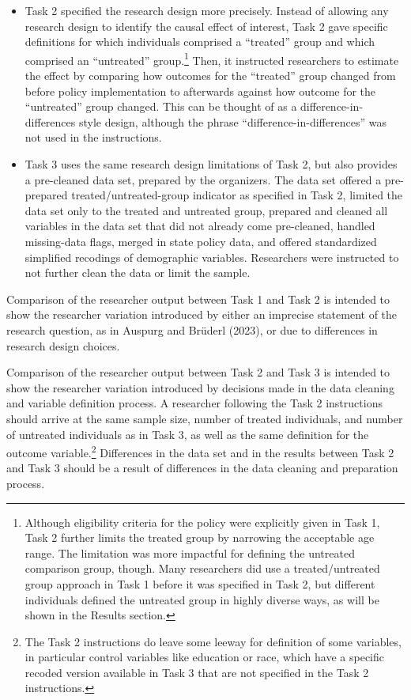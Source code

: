 \documentclass[
  letterpaper,
  DIV=11,
  numbers=noendperiod]{scrartcl}
\begin{document}
\begin{itemize}
\item
  Task 2 specified the research design more precisely. Instead of
  allowing any research design to identify the causal effect of
  interest, Task 2 gave specific definitions for which individuals
  comprised a ``treated'' group and which comprised an ``untreated''
  group.\footnote{Although eligibility criteria for the policy were
    explicitly given in Task 1, Task 2 further limits the treated group
    by narrowing the acceptable age range. The limitation was more
    impactful for defining the untreated comparison group, though. Many
    researchers did use a treated/untreated group approach in Task 1
    before it was specified in Task 2, but different individuals defined
    the untreated group in highly diverse ways, as will be shown in the
    Results section.} Then, it instructed researchers to estimate the
  effect by comparing how outcomes for the ``treated'' group changed
  from before policy implementation to afterwards against how outcome
  for the ``untreated'' group changed. This can be thought of as a
  difference-in-differences style design, although the phrase
  ``difference-in-differences'' was not used in the instructions.
\item
  Task 3 uses the same research design limitations of Task 2, but also
  provides a pre-cleaned data set, prepared by the organizers. The data
  set offered a pre-prepared treated/untreated-group indicator as
  specified in Task 2, limited the data set only to the treated and
  untreated group, prepared and cleaned all variables in the data set
  that did not already come pre-cleaned, handled missing-data flags,
  merged in state policy data, and offered standardized simplified
  recodings of demographic variables. Researchers were instructed to not
  further clean the data or limit the sample.
\end{itemize}

Comparison of the researcher output between Task 1 and Task 2 is
intended to show the researcher variation introduced by either an
imprecise statement of the research question, as in Auspurg and Brüderl
(2023), or due to differences in research design choices.

Comparison of the researcher output between Task 2 and Task 3 is
intended to show the researcher variation introduced by decisions made
in the data cleaning and variable definition process. A researcher
following the Task 2 instructions should arrive at the same sample size,
number of treated individuals, and number of untreated individuals as in
Task 3, as well as the same definition for the outcome
variable.\footnote{The Task 2 instructions do leave some leeway for
  definition of some variables, in particular control variables like
  education or race, which have a specific recoded version available in
  Task 3 that are not specified in the Task 2 instructions.} Differences
in the data set and in the results between Task 2 and Task 3 should be a
result of differences in the data cleaning and preparation process.
\end{document}
